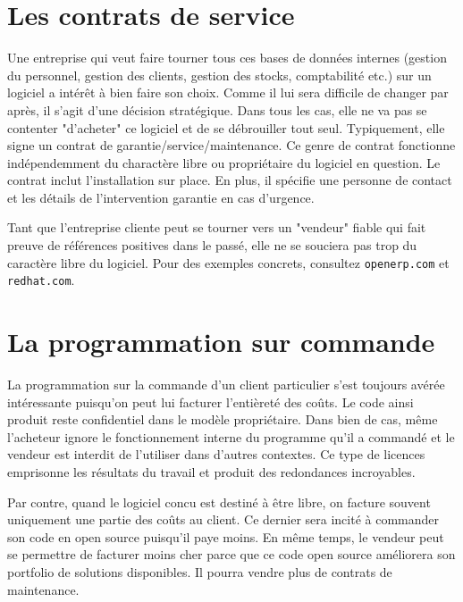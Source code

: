 \section*{Les contrats de service}
Une entreprise qui veut faire tourner tous ces bases de données internes (gestion du personnel,
gestion des clients, gestion des stocks, comptabilité etc.) sur un logiciel a intérêt à bien faire son choix.
Comme il lui sera difficile de changer par après, il s'agit d'une décision stratégique.
Dans tous les cas, elle ne va pas se contenter "d'acheter" ce logiciel et de se débrouiller tout seul.
Typiquement, elle signe un contrat de garantie/service/maintenance. Ce genre de contrat fonctionne indépendemment du
charactère libre ou propriétaire du logiciel en question. Le contrat inclut l'installation sur place.
En plus, il spécifie une personne de contact et les détails de l'intervention garantie en cas d'urgence.

Tant que l'entreprise cliente peut se tourner vers un "vendeur" fiable qui fait preuve de références 
positives dans le passé, elle ne se souciera pas trop du caractère libre du logiciel.
Pour des exemples concrets, consultez \texttt{openerp.com} et \texttt{redhat.com}.

\section*{La programmation sur commande}
La programmation sur la commande d'un client particulier s'est toujours avérée intéressante puisqu'on
peut lui facturer l'entièreté des coûts. Le code ainsi produit reste confidentiel dans le
modèle propriétaire. Dans bien de cas, même l'acheteur ignore le fonctionnement 
interne du programme qu'il a commandé et le vendeur est interdit de l'utiliser dans d'autres contextes.
Ce type de licences emprisonne les résultats du travail et produit des redondances incroyables.

Par contre, quand le logiciel concu est destiné à être libre, on facture souvent uniquement une partie 
des coûts au client. Ce dernier sera incité à commander son code en open source puisqu'il paye moins.
En même temps, le vendeur peut se permettre de facturer moins cher parce que ce code open source
améliorera son portfolio de solutions disponibles. Il pourra vendre plus de contrats de maintenance.

